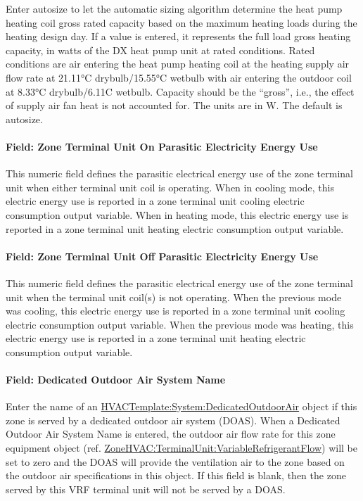 Enter autosize to let the automatic sizing algorithm determine the heat pump heating coil gross rated capacity based on the maximum heating loads during the heating design day. If a value is entered, it represents the full load gross heating capacity, in watts of the DX heat pump unit at rated conditions. Rated conditions are air entering the heat pump heating coil at the heating supply air flow rate at 21.11°C drybulb/15.55°C wetbulb with air entering the outdoor coil at 8.33°C drybulb/6.11C wetbulb. Capacity should be the ``gross'', i.e., the effect of supply air fan heat is not accounted for. The units are in W. The default is autosize.

\paragraph{Field: Zone Terminal Unit On Parasitic Electricity Energy Use}\label{field-zone-terminal-unit-on-parasitic-electric-energy-use}

This numeric field defines the parasitic electrical energy use of the zone terminal unit when either terminal unit coil is operating. When in cooling mode, this electric energy use is reported in a zone terminal unit cooling electric consumption output variable. When in heating mode, this electric energy use is reported in a zone terminal unit heating electric consumption output variable.

\paragraph{Field: Zone Terminal Unit Off Parasitic Electricity Energy Use}\label{field-zone-terminal-unit-off-parasitic-electric-energy-use}

This numeric field defines the parasitic electrical energy use of the zone terminal unit when the terminal unit coil(s) is not operating. When the previous mode was cooling, this electric energy use is reported in a zone terminal unit cooling electric consumption output variable. When the previous mode was heating, this electric energy use is reported in a zone terminal unit heating electric consumption output variable.

\paragraph{Field: Dedicated Outdoor Air System Name}\label{field-dedicated-outdoor-air-system-name-5}

Enter the name of an \hyperref[hvactemplatesystemdedicatedoutdoorair]{HVACTemplate:System:DedicatedOutdoorAir} object if this zone is served by a dedicated outdoor air system (DOAS). When a Dedicated Outdoor Air System Name is entered, the outdoor air flow rate for this zone equipment object (ref. \hyperref[zonehvacterminalunitvariablerefrigerantflow]{ZoneHVAC:TerminalUnit:VariableRefrigerantFlow}) will be set to zero and the DOAS will provide the ventilation air to the zone based on the outdoor air specifications in this object. If this field is blank, then the zone served by this VRF terminal unit will not be served by a DOAS.

